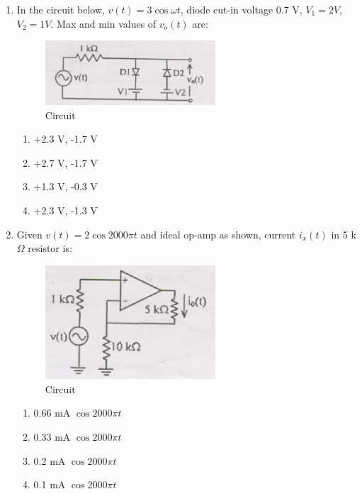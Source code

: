 \documentclass[journal,cmex10]{IEEEtran}
\theoremstyle{remark}
\numberwithin{equation}{enumi}
\numberwithin{figure}{enumi}
\begin{document}
\begin{enumerate}[label=\arabic*)]
    \item In the circuit below, $v(t) = 3\cos \omega t$, diode cut-in voltage 0.7 V, $V_1 = 2V$, $V_2=1V$. Max and min values of $v_o(t)$ are:
    \begin{figure}[htbp]
  \centering
  \includegraphics[width=0.6\textwidth]{figs/C/fig9.png}
  \caption{Circuit}
  \label{C/fig9.png}
\end{figure}
    \bigskip
    \hfill {}
    \begin{enumerate}[label=\alph*)]
        \item +2.3 V, -1.7 V
        \item +2.7 V, -1.7 V
        \item +1.3 V, -0.3 V
        \item +2.3 V, -1.3 V
    \end{enumerate}
    \bigskip

    \item Given $v(t) = 2 \cos 2000 \pi t$ and ideal op-amp as shown, current $i_x(t)$ in 5 k$\Omega$ resistor is:
    \begin{figure}[htbp]
  \centering
  \includegraphics[width=0.6\textwidth]{figs/C/fig10.png}
  \caption{Circuit}
  \label{C/fig10.png}
\end{figure}
    \bigskip
    \hfill {}
    \begin{enumerate}[label=\alph*)]
        \item 0.66 mA $\cos 2000 \pi t$
        \item 0.33 mA $\cos 2000 \pi t$
        \item 0.2 mA $\cos 2000 \pi t$
        \item 0.1 mA $\cos 2000 \pi t$
    \end{enumerate}
    \newpage


\end{enumerate}
\end{document}
